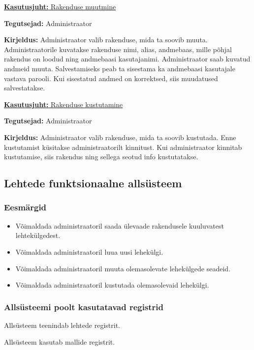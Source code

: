 \documentclass[a4paper,12pt]{article} %
\begin{document}
\underline{\textbf{Kasutusjuht:} Rakenduse muutmine}
\par
\textbf{Tegutsejad:} Administraator
\par
\textbf{Kirjeldus:} Administraator valib rakenduse, mida ta soovib muuta. Administraatorile kuvatakse rakenduse nimi, alias, andmebaas, mille põhjal rakendus on loodud ning andmebaasi kasutajanimi. Administraator saab kuvatud andmeid muuta. Salvestamiseks peab ta sisestama ka andmebaasi kasutajale vastava parooli. Kui sisestatud andmed on korrektsed, siis muudatused salvestatakse.
\par

\underline{\textbf{Kasutusjuht:} Rakenduse kustutamine}
\par
\textbf{Tegutsejad:} Administraator
\par
\textbf{Kirjeldus:} Administraator valib rakenduse, mida ta soovib kustutada. Enne kustutamist küsitakse administraatorilt kinnitust. Kui administraator kinnitab kustutamise, siis rakendus ning sellega seotud info kustutatakse.
\par
\subsection{Lehtede funktsionaalne allsüsteem}
\subsubsection{Eesmärgid}
\begin{itemize}
\item Võimaldada administraatoril saada ülevaade rakendusele kuuluvatest lehtekülgedest.
\item Võimaldada administraatoril luua uusi lehekülgi.
\item Võimaldada administraatoril muuta olemasolevate lehekülgede seadeid.
\item Võimaldada administraatoril kustutada olemasolevaid lehekülgi.
\end{itemize}
\subsubsection{Allsüsteemi poolt kasutatavad registrid}
Allsüsteem teenindab lehtede registrit.\par
Allsüsteem kasutab mallide registrit.
\end{document}
